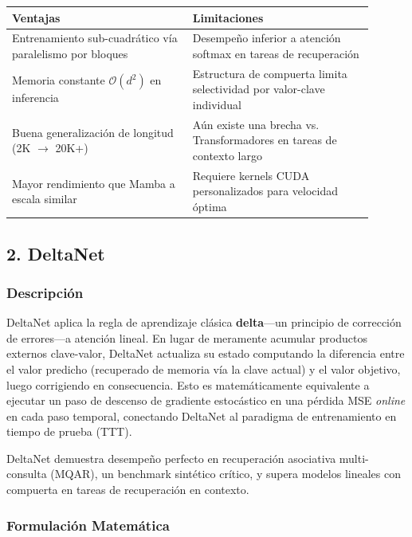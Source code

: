 \documentclass[11pt,a4paper]{article}
\begin{document}
\begin{table}[h]
\centering
\begin{tabular}{|p{0.45\linewidth}|p{0.45\linewidth}|}
\hline
\textbf{Ventajas} & \textbf{Limitaciones} \\
\hline
Entrenamiento sub-cuadrático vía paralelismo por bloques & Desempeño inferior a atención softmax en tareas de recuperación \\
\hline
Memoria constante $\mathcal{O}(d^2)$ en inferencia & Estructura de compuerta limita selectividad por valor-clave individual \\
\hline
Buena generalización de longitud (2K $\rightarrow$ 20K+) & Aún existe una brecha vs. Transformadores en tareas de contexto largo \\
\hline
Mayor rendimiento que Mamba a escala similar & Requiere kernels CUDA personalizados para velocidad óptima \\
\hline
\end{tabular}
\end{table}

\subsection{2. DeltaNet}

\subsubsection{Descripción}

DeltaNet aplica la regla de aprendizaje clásica \textbf{delta}---un principio de corrección de errores---a atención lineal. En lugar de meramente acumular productos externos clave-valor, DeltaNet actualiza su estado computando la diferencia entre el valor predicho (recuperado de memoria vía la clave actual) y el valor objetivo, luego corrigiendo en consecuencia. Esto es matemáticamente equivalente a ejecutar un paso de descenso de gradiente estocástico en una pérdida MSE \textit{online} en cada paso temporal, conectando DeltaNet al paradigma de entrenamiento en tiempo de prueba (TTT).

DeltaNet demuestra desempeño perfecto en recuperación asociativa multi-consulta (MQAR), un benchmark sintético crítico, y supera modelos lineales con compuerta en tareas de recuperación en contexto.

\subsubsection{Formulación Matemática}
\end{document}
